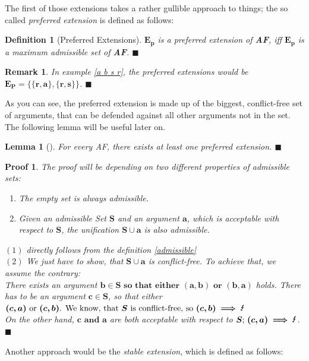 \documentclass[12pt]{report}
\numberwithin{figure}{chapter}
\theoremstyle{break}
\newtheorem{defn}{Definition}[chapter]
\newtheorem{lem}{Lemma}[chapter]
\newtheorem*{prf}{Proof}
\newtheorem*{rmrk}{Remark}
\newenvironment{mydefn}{\begin{defn}}{$\blacksquare$ \end{defn}}
\newenvironment{mylem}{\begin{lem}}{$\blacksquare$ \end{lem}}
\newenvironment{myprf}{\begin{prf}}{$\blacksquare$ \end{prf}}
\newenvironment{myrmrk}{\begin{rmrk}}{$\blacksquare$ \end{rmrk}}
\begin{document}
The first of those extensions takes a rather gullible approach to things; the so called \textit{preferred extension} is defined as follows:

\begin{mydefn}[Preferred Extensions]
$\bm{E_{p}}$ is a preferred extension of \textbf{AF}, iff $\bm{E_{p}}$ is a maximum admissible set of \textbf{AF}.
\end{mydefn}

\begin{myrmrk}
In example \ref{a b s r}, the preferred extensions would be $\bm{E_{P} = \{\{r,a\},\{r,s\}\}}$.
\end{myrmrk}

As you can see, the preferred extension is made up of the biggest, conflict-free set of arguments, that can be defended against all other arguments not in the set.\\
The following lemma will be useful later on.
\begin{mylem}[\cite{Dung}]
For every AF, there exists at least one preferred extension.
\end{mylem}

\begin{myprf}
The proof will be depending on two different properties of admissible sets:
\begin{enumerate}
	\item{The empty set is always admissible.}
	\item{Given an admissible Set $\bm{S}$ and an argument $\bm{a}$, which is acceptable with respect to $\bm{S}$, the unification $\bm{S \cup a}$ is also admissible.}
\end{enumerate}
$(1)$ directly follows from the definition \ref{admissible}\\
$(2)$ We just have to show, that $\bm{S \cup a}$ is conflict-free. To achieve that, we assume the contrary:\\ 
There exists an argument $\bm{b \in S \text{ so that either } (a,b) \text{ or } (b,a)}$ holds.
There has to be an argument $\bm{c \in S}$, so that either $\bm{(c,a) \text{ or } (c,b) \text{. We know, that } S \text{ is conflict-free, so } (c,b) \implies \text{\Lightning}}$\\
On the other hand, $\bm{c \text{ and } a}$ are both acceptable with respect to $\bm{S \text{; } (c,a) \implies \text{\Lightning}}$.  
\end{myprf}

Another approach would be the \textit{stable extension}, which is defined as follows:
\end{document}
